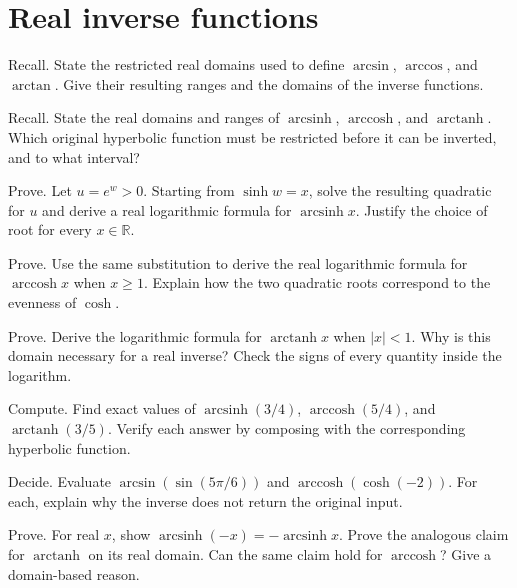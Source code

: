 \documentclass{workbook}
\DeclareMathOperator{\arcsinh}{arcsinh}
\DeclareMathOperator{\arccosh}{arccosh}
\DeclareMathOperator{\arctanh}{arctanh}
\newcommand{\R}{\mathbb{R}}
\begin{document}
\section{Real inverse functions}

\begin{problem}{Recall.}
State the restricted real domains used to define $\arcsin$, $\arccos$,
and $\arctan$. Give their resulting ranges and the domains of the
inverse functions.
\end{problem}

\begin{problem}{Recall.}
State the real domains and ranges of $\arcsinh$, $\arccosh$, and
$\arctanh$. Which original hyperbolic function must be restricted
before it can be inverted, and to what interval?
\end{problem}

\begin{problem}{Prove.}
Let $u=e^w>0$. Starting from $\sinh w=x$, solve the resulting
quadratic for $u$ and derive a real logarithmic formula for
$\arcsinh x$. Justify the choice of root for every $x\in\R$.
\end{problem}

\begin{problem}{Prove.}
Use the same substitution to derive the real logarithmic formula for
$\arccosh x$ when $x\geq1$. Explain how the two quadratic roots
correspond to the evenness of $\cosh$.
\end{problem}

\begin{problem}{Prove.}
Derive the logarithmic formula for $\arctanh x$ when $|x|<1$.
Why is this domain necessary for a real inverse? Check the signs of
every quantity inside the logarithm.
\end{problem}

\begin{problem}{Compute.}
Find exact values of $\arcsinh(3/4)$, $\arccosh(5/4)$,
and $\arctanh(3/5)$. Verify each answer by composing with the
corresponding hyperbolic function.
\end{problem}

\begin{problem}{Decide.}
Evaluate $\arcsin(\sin(5\pi/6))$ and
$\arccosh(\cosh(-2))$. For each, explain why the inverse does not
return the original input.
\end{problem}

\begin{problem}{Prove.}
For real $x$, show $\arcsinh(-x)=-\arcsinh x$.
Prove the analogous claim for $\arctanh$ on its real domain.
Can the same claim hold for $\arccosh$? Give a domain-based reason.
\end{problem}
\end{document}
